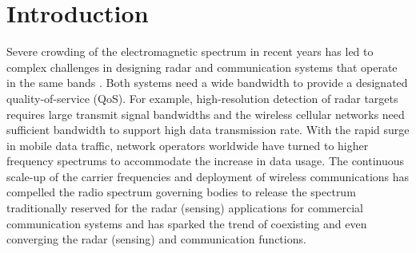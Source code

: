 \documentclass[9pt,journal]{IEEEtran}
\begin{document}
\section{Introduction}
Severe crowding of the electromagnetic spectrum in recent years has led to complex challenges in designing radar and communication systems that operate in the same bands \cite{chiriyath2017radar,mishra2019toward,dokhanchi2019mmwave,zheng2019overiview}. Both systems need a wide bandwidth to provide a designated quality-of-service (QoS). For example, high-resolution detection of radar targets requires large transmit signal bandwidths \cite{mishra2018sub} and the wireless cellular networks need sufficient bandwidth to support high data transmission rate\cite{biswas2018fdqos}. With the rapid surge in mobile data traffic, network operators worldwide have turned to higher frequency spectrums to accommodate the increase in data usage. The continuous scale-up of the carrier frequencies and deployment of wireless communications has compelled the radio spectrum governing bodies to release the spectrum traditionally reserved for the radar (sensing) applications for commercial communication systems \cite{darpa2016} and has sparked the trend of coexisting and even converging the radar (sensing) and communication functions\cite{zheng2019overiview}. %

\end{document}
